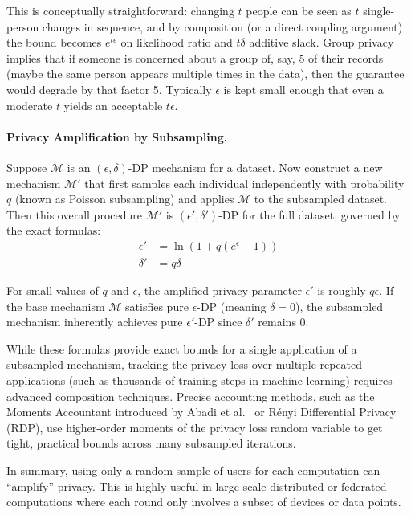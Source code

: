 \documentclass[11pt, a4paper]{article}
\begin{document}
This is conceptually straightforward: changing $t$ people can be seen as $t$ single-person changes in sequence, and by composition (or a direct coupling argument) the bound becomes $e^{t\epsilon}$ on likelihood ratio and $t\delta$ additive slack. Group privacy implies that if someone is concerned about a group of, say, 5 of their records (maybe the same person appears multiple times in the data), then the guarantee would degrade by that factor 5. Typically $\epsilon$ is kept small enough that even a moderate $t$ yields an acceptable $t\epsilon$.




\paragraph{Privacy Amplification by Subsampling.} 
Suppose $\mathcal{M}$ is an $(\epsilon, \delta)$-DP mechanism for a dataset. Now construct a new mechanism $\mathcal{M}'$ that first samples each individual independently with probability $q$ (known as Poisson subsampling) and applies $\mathcal{M}$ to the subsampled dataset. Then this overall procedure $\mathcal{M}'$ is $(\epsilon', \delta')$-DP for the full dataset, governed by the exact formulas:
\begin{align*}
\epsilon' &= \ln(1 + q(e^\epsilon - 1)) \\
\delta' &= q\delta
\end{align*}

For small values of $q$ and $\epsilon$, the amplified privacy parameter $\epsilon'$ is roughly $q\epsilon$. If the base mechanism $\mathcal{M}$ satisfies pure $\epsilon$-DP (meaning $\delta = 0$), the subsampled mechanism inherently achieves pure $\epsilon'$-DP since $\delta'$ remains $0$. 

While these formulas provide exact bounds for a single application of a subsampled mechanism, tracking the privacy loss over multiple repeated applications (such as thousands of training steps in machine learning) requires advanced composition techniques. Precise accounting methods, such as the Moments Accountant introduced by Abadi et al.\ \cite{Abadi2016} or Rényi Differential Privacy (RDP), use higher-order moments of the privacy loss random variable to get tight, practical bounds across many subsampled iterations. 

In summary, using only a random sample of users for each computation can ``amplify'' privacy. This is highly useful in large-scale distributed or federated computations where each round only involves a subset of devices or data points.
\end{document}
